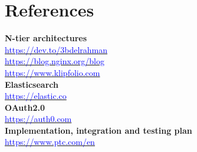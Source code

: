 \documentclass[11pt,twoside]{article}
\begin{document}
\section{References}
\textbf{N-tier architectures}\\
\href{https://dev.to/3bdelrahman/understanding-layers-tiers-and-n-tier-architecture-in-application-development-1hlb}{\textcolor{blue}{https://dev.to/3bdelrahman}}\\
\href{https://blog.nginx.org/blog/time-to-move-to-a-four-tier-application-architecture#:~:text=Forrester\%27s\%20Four‑Tier\%20Engagement\%20Platform,\%2C\%20aggregation\%2C\%20and\%20services\%20layers.}{\textcolor{blue}{https://blog.nginx.org/blog}}\\
\href{https://www.klipfolio.com/resources/data-stack/integration-layer}{\textcolor{blue}{https://www.klipfolio.com}}
\vspace{1\baselineskip} \\
\textbf{Elasticsearch} \\
\href{https://www.elastic.co}{\textcolor{blue}{https://elastic.co}}
\vspace{1\baselineskip} \\
\textbf{OAuth2.0} \\
\href{https://auth0.com/intro-to-iam/what-is-oauth-2}{\textcolor{blue}{https://auth0.com}}
\vspace{1\baselineskip} \\
\textbf{Implementation, integration and testing plan} \\
\href{https://www.ptc.com/en/success-paths/get-started-with-thingworx-dpm/design/determine-implementation-and-testing-plan}{\textcolor{blue}{https://www.ptc.com/en}}
\end{document}
